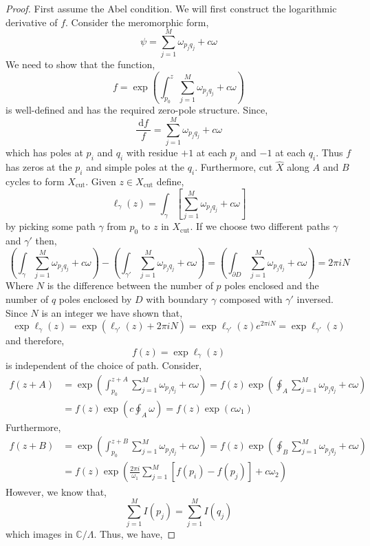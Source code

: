 \documentclass[12pt]{extarticle}
\newcommand{\C}{\mathbb{C}}
\renewcommand{\d}[1]{\: \mathrm{d}#1 \:}
\theoremstyle{definition}
\newcommand{\Xcut}{X_{\text{cut}}}
\begin{document}
\begin{proof}
First assume the Abel condition. We will first construct the logarithmic derivative of $f$. Consider the meromorphic form,
\[ \psi = \sum_{j = 1}^M \omega_{p_j q_j} + c \omega \]
We need to show that the function,
\[ f = \exp{\left( \int_{p_0}^z \sum_{j = 1}^M \omega_{p_j q_j} + c \omega \right) } \]
is well-defined and has the required zero-pole structure. Since,
\[ \frac{\d{f}}{f} = \sum_{j = 1}^M \omega_{p_j q_j} + c \omega \]
which has poles at $p_i$ and $q_i$ with residue $+1$ at each $p_i$ and $-1$ at each $q_i$. Thus $f$ has zeros at the $p_i$ and simple poles at the $q_i$. Furthermore, cut $\hat{X}$ along $A$ and $B$ cycles to form $\Xcut$. Given $z \in \Xcut$ define,
\[ \ell_{\gamma}(z) = \int_{\gamma} \left[ \sum_{j = 1}^M \omega_{p_j q_j} + c \omega \right] \]
by picking some path $\gamma$ from $p_0$ to $z$ in $\Xcut$. If we choose two different paths $\gamma$ and $\gamma'$ then,
\[ \left( \int_{\gamma} \sum_{j = 1}^M \omega_{p_j q_j} + c \omega  \right) - \left( \int_{\gamma'} \sum_{j = 1}^M \omega_{p_j q_j} + c \omega  \right) = \left( \int_{\partial D} \sum_{j = 1}^M \omega_{p_j q_j} + c \omega  \right)  = 2 \pi i N \]
Where $N$ is the difference between the number of $p$ poles enclosed and the number of $q$ poles enclosed by $D$ with boundary $\gamma$ composed with $\gamma'$ inversed. Since $N$ is an integer we have shown that,
\[ \exp{\ell_{\gamma}(z)} = \exp{\left( \ell_{\gamma'}(z) + 2 \pi i N \right)} = \exp{\ell_{\gamma'}(z)} e^{2 \pi i N} = \exp{\ell_{\gamma'}(z)} \]
and therefore,
\[ f(z) = \exp{\ell_{\gamma}(z)} \]
is independent of the choice of path. Consider,
\begin{align*}
f(z + A) & = \exp{\left( \int_{p_0}^{z + A} \sum_{j = 1}^M \omega_{p_j q_j} + c \omega \right)} = f(z) \exp{\left( \oint_A \sum_{j = 1}^M \omega_{p_j q_j} + c \omega \right)} 
\\
& = f(z) \exp{\left( c \oint_A \omega \right) } = f(z) \exp{(c \omega_1)}
\end{align*}
Furthermore,
\begin{align*}
f(z + B) & = \exp{\left( \int_{p_0}^{z + B} \sum_{j = 1}^M \omega_{p_j q_j} + c \omega \right)} = f(z) \exp{\left( \oint_B \sum_{j = 1}^M \omega_{p_j q_j} + c \omega \right)} 
\\
& = f(z) \exp{\left( \frac{2 \pi i}{\omega_1} \sum_{j = 1}^M \left[ f(p_i) - f(p_j) \right] + c \omega_2 \right) } 
\end{align*}
However, we know that,
\[ \sum_{j = 1}^M I(p_j) = \sum_{j = 1}^M I(q_j) \]
which images in $\C / \Lambda$. Thus, we have,

\end{proof}
\end{document}
